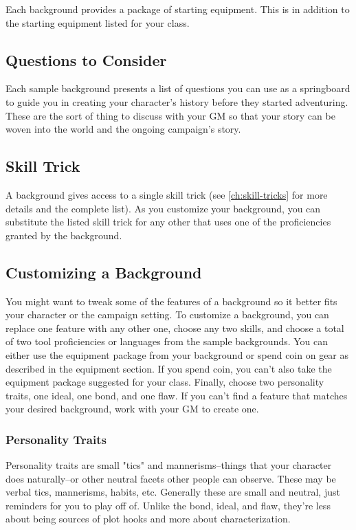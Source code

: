 \documentclass[draft]{article}
\begin{document}
Each background provides a package of starting equipment. This is in addition to the starting equipment listed for your class.

\subsection{Questions to Consider}
Each sample background presents a list of questions you can use as a springboard to guide you in creating your character's history before they started adventuring. These are the sort of thing to discuss with your GM so that your story can be woven into the world and the ongoing campaign's story.

\subsection{Skill Trick}

A background gives access to a single skill trick (see \ref{ch:skill-tricks} for more details and the complete list). As you customize your background, you can substitute the listed skill trick for any other that uses one of the proficiencies granted by the background.

\subsection{Customizing a Background} 

You might want to tweak some of the features of a background so it better fits your character or the campaign setting. To customize a background, you can replace one feature with any other one, choose any two skills, and choose a total of two tool proficiencies or languages from the sample backgrounds. You can either use the equipment package from your background or spend coin on gear as described in the equipment section. If you spend coin, you can't also take the equipment package suggested for your class. Finally, choose two personality traits, one ideal, one bond, and one flaw. If you can't find a feature that matches your desired background, work with your GM to create one.

\subsubsection{Personality Traits}
Personality traits are small "tics" and mannerisms--things that your character does naturally--or other neutral facets other people can observe. These may be verbal tics, mannerisms, habits, etc. Generally these are small and neutral, just reminders for you to play off of. Unlike the bond, ideal, and flaw, they're less about being sources of plot hooks and more about characterization.
\end{document}
